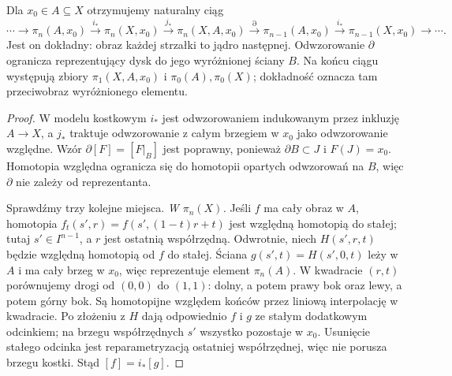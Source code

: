 \begin{twierdzenie}
\label{thm:les-pi}
Dla $x_0\in A\subseteq X$ otrzymujemy
naturalny ciąg
\begin{equation}\label{eq:les-pi}
 \cdots\to\pi_n(A,x_0)\xrightarrow{i_*}
 \pi_n(X,x_0)\xrightarrow{j_*}
 \pi_n(X,A,x_0)\xrightarrow{\partial}
 \pi_{n-1}(A,x_0)\xrightarrow{i_*}
 \pi_{n-1}(X,x_0)\to\cdots .
\end{equation}
Jest on dokładny: obraz każdej
strzałki to jądro następnej.
Odwzorowanie $\partial$ ogranicza
reprezentujący dysk do jego
wyróżnionej ściany $B$.
Na końcu ciągu występują
zbiory $\pi_1(X,A,x_0)$ i
$\pi_0(A),\pi_0(X)$; dokładność
oznacza tam przeciwobraz
wyróżnionego elementu.
\end{twierdzenie}
\begin{proof}
W modelu kostkowym $i_*$ jest
odwzorowaniem indukowanym przez inkluzję $A\to X$, a $j_*$
traktuje odwzorowanie z całym brzegiem
w $x_0$ jako odwzorowanie względne.
Wzór $\partial[F]=[F|_B]$
jest poprawny, ponieważ
$\partial B\subset J$ i
$F(J)=x_0$. Homotopia
względna ogranicza się
do homotopii opartych
odwzorowań na $B$, więc
$\partial$ nie zależy
od reprezentanta.

Sprawdźmy trzy kolejne miejsca.
\emph{W $\pi_n(X)$.} Jeśli $f$ ma cały obraz w $A$, homotopia
$f_t(s',r)=f(s',(1-t)r+t)$ jest względną homotopią do stałej;
tutaj $s'\in I^{n-1}$, a $r$ jest ostatnią współrzędną.
Odwrotnie, niech $H(s',r,t)$ będzie względną homotopią
od $f$ do stałej. Ściana $g(s',t)=H(s',0,t)$ leży w $A$
i ma cały brzeg w $x_0$, więc reprezentuje element $\pi_n(A)$.
W kwadracie $(r,t)$ porównujemy drogi od $(0,0)$ do $(1,1)$:
dolny, a potem prawy bok oraz lewy, a potem górny bok.
Są homotopijne względem końców przez liniową interpolację w kwadracie.
Po złożeniu z $H$ dają odpowiednio $f$ i $g$ ze stałym dodatkowym
odcinkiem; na brzegu współrzędnych $s'$ wszystko pozostaje w $x_0$.
Usunięcie stałego odcinka jest reparametryzacją ostatniej współrzędnej,
więc nie porusza brzegu kostki. Stąd $[f]=i_*[g]$.


\end{proof}
